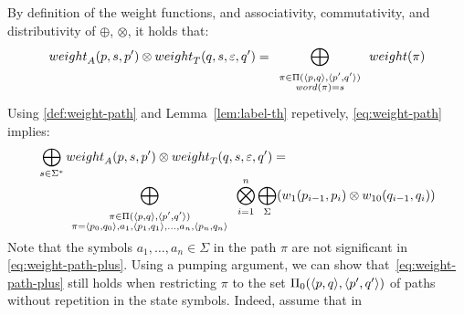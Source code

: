 By definition of the weight functions, and 
associativity, commutativity, and distributivity of $\oplus$, $\otimes$,  
it holds that:
\begin{equation}\label{eq:weight-path}
\weight_A(p, s, p') \otimes \weight_T(q, s, \varepsilon, q') = 
\bigoplus_{\begin{array}{c}
		   \scriptstyle\pi \in \Pi(\< p, q>, \< p', q'>)\\[-1ex]
		   \scriptstyle\word(\pi) = s
		   \end{array}} 
\weight(\pi) 
\end{equation}
%
Using \eqref{def:weight-path} 
and Lemma~\ref{lem:label-th} repetively, 
\eqref{eq:weight-path} implies:
%
\begin{equation}\label{eq:weight-path-plus}
\begin{array}{l}
\displaystyle\bigoplus_{s \in \Sigma^*} 
  \weight_A(p, s, p') \otimes \weight_T(q, s, \varepsilon, q') =\\
\multicolumn{1}{r}{%
\qquad
\displaystyle\bigoplus_{\begin{array}{c}
		   \scriptstyle\pi \in \Pi(\< p, q>, \< p', q'>)\\[-1ex]
		   \scriptstyle\pi = \< p_0, q_0>, a_1,\< p_1, q_1>,\ldots, a_n, \< p_n, q_n>\\[-1ex]
		   \end{array}} 
\displaystyle\bigotimes_{i = 1}^{n} 
\displaystyle\bigoplus_\Sigma (\wei_1(p_{i-1}, p_i) \otimes
                  \wei_{10}(q_{i-1}, q_i))
}
\end{array}           %
\end{equation}
%
Note that the symbols $a_1, \ldots, a_n \in \Sigma$ in the path $\pi$
are not significant in \eqref{eq:weight-path-plus}.
%
Using a pumping argument, we can show that~\eqref{eq:weight-path-plus}
still holds when restricting $\pi$ to the set $\Pi_0(\< p, q>, \< p', q'>)$
of paths without repetition in the state symbols.
%
Indeed, assume that in 
